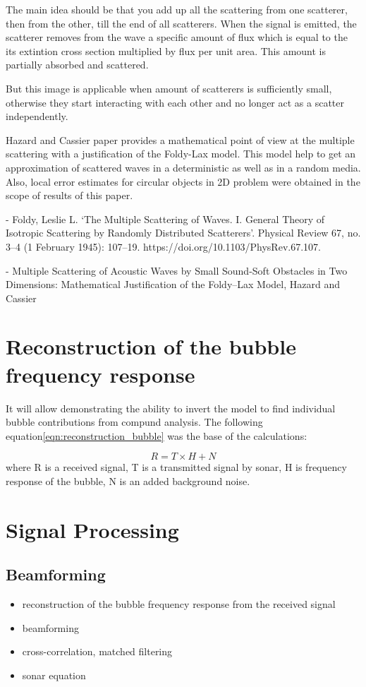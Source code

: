The main idea should be that you add up all the scattering from one scatterer, then from the other, till the end of all scatterers. When the signal is emitted, the scatterer removes from the wave a specific amount of flux which is equal to the its extintion cross section multiplied by flux per unit area. This amount is partially absorbed and scattered. 

But this image is applicable when amount of scatterers is sufficiently small, otherwise they start interacting with each other and no longer act as a scatter independently.

Hazard and Cassier paper provides a mathematical point of view at the multiple scattering with a justification of the Foldy-Lax model. This model help to get an approximation of scattered waves in a deterministic as well as in a random media. Also, local error estimates for circular objects in 2D problem were obtained in the scope of results of this paper.

- Foldy, Leslie L. ‘The Multiple Scattering of Waves. I. General Theory of Isotropic Scattering by Randomly Distributed Scatterers’. Physical Review 67, no. 3–4 (1 February 1945): 107–19. https://doi.org/10.1103/PhysRev.67.107.

- Multiple Scattering of Acoustic Waves by Small Sound-Soft Obstacles in Two Dimensions: Mathematical Justification of the Foldy–Lax Model, Hazard and Cassier


\section{Reconstruction of the bubble frequency response}

It will allow demonstrating the ability to invert the model to find individual bubble contributions from compund analysis.
The following equation\ref{eqn:reconstruction_bubble} was the base of the calculations:

\begin{equation}\label{eqn:reconstruction_bubble}
    R = T \times H + N
\end{equation}
where R is a received signal, T is a transmitted signal by sonar, H is frequency response of the bubble, N is an added background noise.

\section{Signal Processing}
\subsection{Beamforming}
\begin{itemize}
    \item reconstruction of the bubble frequency response from the received signal
    \item beamforming
    \item cross-correlation, matched filtering
    \item sonar equation
\end{itemize}

